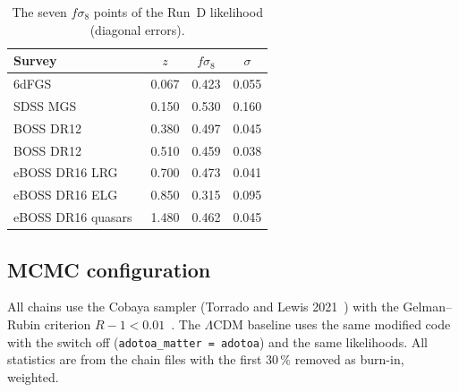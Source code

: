 \begin{table}[htbp]\centering\small
\caption{The seven $f\sigma_8$ points of the Run~D likelihood (diagonal errors). \observed}\label{tab:l2_rsd_data}
\begin{tabular}{lccc}\hline
Survey & $z$ & $f\sigma_8$ & $\sigma$\\\hline
6dFGS~\cite{Beutler2012} & 0.067 & 0.423 & 0.055\\
SDSS MGS~\cite{Howlett2015,Alam2021} & 0.150 & 0.530 & 0.160\\
BOSS DR12~\cite{Alam2017,Alam2021} & 0.380 & 0.497 & 0.045\\
BOSS DR12~\cite{Alam2017,Alam2021} & 0.510 & 0.459 & 0.038\\
eBOSS DR16 LRG~\cite{Alam2021} & 0.700 & 0.473 & 0.041\\
eBOSS DR16 ELG~\cite{Alam2021} & 0.850 & 0.315 & 0.095\\
eBOSS DR16 quasars~\cite{Alam2021} & 1.480 & 0.462 & 0.045\\\hline
\end{tabular}\end{table}

\subsection{MCMC configuration}
All chains use the Cobaya sampler (Torrado and Lewis 2021~\cite{Torrado2021}) with the Gelman--Rubin criterion $R-1<0.01$~\cite{Gelman1992}. The
$\Lambda$CDM baseline uses the same modified code with the switch off (\texttt{adotoa\_matter = adotoa}) and the same likelihoods. All statistics are
from the chain files with the first $30\,\%$ removed as burn-in, weighted.

